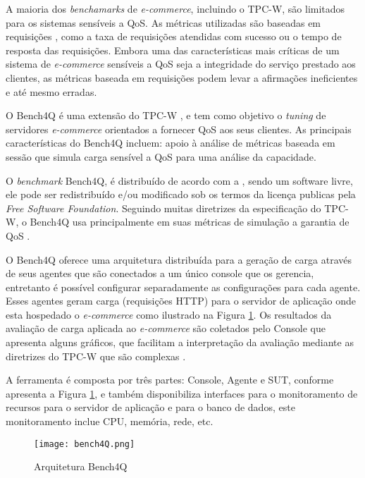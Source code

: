 A maioria dos \textit{benchamarks} de \textit{e-commerce}, incluindo o TPC-W, são limitados para os sistemas sensíveis a QoS. As métricas utilizadas são baseadas em requisições , como a taxa de requisições atendidas com sucesso ou o tempo de resposta das requisições. Embora uma das características mais críticas de um sistema de \textit{e-commerce} sensíveis a QoS seja a integridade do serviço prestado aos clientes, as métricas baseada em requisições podem levar a afirmações ineficientes e até mesmo erradas.

O Bench4Q é uma extensão do TPC-W \cite{Menasce2002}, e tem como objetivo o \textit{tuning} de servidores \textit{e-commerce} orientados a fornecer QoS aos seus clientes. As principais características do Bench4Q incluem: 
apoio à análise de métricas baseada em sessão que simula carga sensível a QoS para uma análise da capacidade. 

O \textit{benchmark} Bench4Q, é distribuído de acordo com a , sendo um software livre, ele pode ser redistribuído e/ou modificado sob os termos da licença publicas pela \textit{Free Software Foundation}. Seguindo muitas diretrizes da especificação do TPC-W, o Bench4Q usa principalmente em suas métricas de simulação a garantia de QoS \cite{Bench4Q}. 

O Bench4Q oferece uma arquitetura distribuída para a geração de carga através de seus agentes que são conectados a um único console que os gerencia, entretanto é possível configurar separadamente as configurações para cada agente. Esses agentes geram carga (requisições HTTP) para o servidor de aplicação onde esta hospedado o \textit{e-commerce} como ilustrado na Figura \ref{fig:arquitetura-bench4q}. Os resultados da avaliação de carga aplicada ao \textit{e-commerce} são coletados pelo Console que apresenta alguns gráficos, que facilitam a interpretação da avaliação mediante as diretrizes do TPC-W que são complexas \cite{Bench4Q}.

A ferramenta é composta por três partes: Console, Agente e SUT, conforme apresenta a Figura \ref{fig:arquitetura-bench4q}, e também disponibiliza interfaces para o monitoramento de recursos para o servidor de aplicação e para o banco de dados, este monitoramento inclue CPU, memória, rede, etc.


\begin{figure}[htb]
	\centering
	\texttt{[image: bench4Q.png]}
	\caption{Arquitetura Bench4Q}
	\label{fig:arquitetura-bench4q}
\end{figure}

